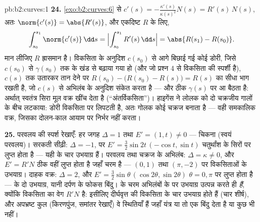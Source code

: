 \begin{solution}{pb:b2:curves:1}
\textbf{24.} \cref{exo:b2:curves:6} से $c'(s) =
-\frac{\kappa'(s)}{\kappa(s)^2}N(s) = R'(s)\,N(s)$, अतः
$\norm{c'(s)} = \abs{R'(s)}$, और एकदिष्ट $R$ के लिए,
\[
\int_{s_0}^{s_1}\norm{c'(s)}\,\dd s =
\Bigl|\int_{s_0}^{s_1}R'(s)\,\dd s\Bigr| = \abs{R(s_1) -
R(s_0)} .
\]
मान लीजिए $R$ ह्रासमान है। विकसिता के अनुदिश $c(s_0)$ से आगे
बिछाई गई कोई डोरी, जिसे $c(s_0)$ से $\gamma(s_0)$ तक के खंड से
बढ़ाया गया हो (और जो प्रश्न 4 से विकसिता की स्पर्शी है), $c(s)$ तक
उतारकर तान देने पर $R(s_0) - \bigl(R(s_0) - R(s)\bigr) = R(s)$  का सीधा भाग
रखती है, जो $c(s)$ से अभिलंब के अनुदिश संकेत करता है --- और ठीक
$\gamma(s)$ पर आ बैठता है: अर्थात् स्वतंत्र सिरा मूल वक्र
खींच देता है (``अंतर्विकसिता'')। हाइगेंस ने लोलक को दो चक्रजीय गालों
के बीच लटकाया: डोरी विकसिता पर लिपटती है, अतः गोलक कोई चक्रज बनाता
है --- वही समकालिक वक्र, जिसका दोलन-काल आयाम पर निर्भर नहीं करता।

\textbf{25.} परवलय की स्पर्श रेखाएँ: हर जगह $\Delta = 1$ तथा $E' =
(1, t) \neq 0$ --- चिकना  (स्वयं
परवलय)। सरकती सीढ़ी: $\Delta = -1$, पर $E' =
\tfrac32\sin 2t\,(-\cos t, \sin t)$ चतुर्थांश के सिरों पर लुप्त
होता है --- यही  के चार उभयाग्र हैं। परवलय तथा चक्रज के
अभिलंब: $\Delta = \kappa \neq 0$, और $E' = R'N$ ठीक वहीं लुप्त होता है जहाँ 
चरम है --- $(0,1)$ तथा $(\pi, -2)$ पर विकसिताओं के उभयाग्र। दाहक वक्र:
$\Delta = 2$, और $E' = \tfrac32\sin\theta\,(\cos2\theta,
\sin2\theta)$ $\theta = 0, \pi$ पर लुप्त होता है ---  के दो
उभयाग्र, यानी दर्पण के फोकस बिंदु।  के चरम अभिलंबों के
 पर उभयाग्र उत्पन्न करते ही \emph{हैं}, क्योंकि विकसिता का
वेग $R'N$ है: इसीलिए दीर्घवृत्त की विकसिता के चार उभयाग्र होते
हैं (चार शीर्ष), और अपभ्रष्ट कुल (किरणपुंज, समांतर रेखाएँ) वे
स्थितियाँ हैं जहाँ यंत्र या तो एक बिंदु देता है या कुछ भी नहीं।
\end{solution}
